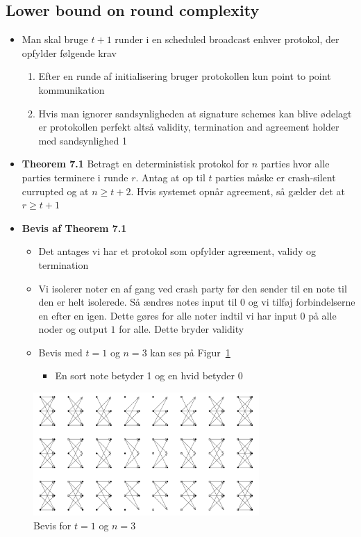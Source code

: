 \documentclass[a4, english]{article}
\begin{document}
\subsection{Lower bound on round complexity}
\begin{itemize}
	\item Man skal bruge $t+1$ runder i en scheduled broadcast enhver protokol, der opfylder følgende krav
  \begin{enumerate}
  	\item Efter en runde af initialisering bruger protokollen kun point to point kommunikation  
    \item Hvis man ignorer sandsynligheden at signature schemes kan blive ødelagt er protokollen perfekt altså validity, termination and agreement holder med sandsynlighed 1
  \end{enumerate}
  \item \textbf{Theorem 7.1} Betragt en deterministisk protokol for $n$ parties hvor alle parties terminere i runde $r$. Antag at op til $t$ parties måske er crash-silent currupted og at $n\geq t+2$. Hvis systemet opnår agreement, så gælder det at $r \geq t+1$  
  \item \textbf{Bevis af Theorem 7.1}
  \begin{itemize}
  	\item Det antages vi har et protokol som opfylder agreement, validy og termination
    \item Vi isolerer noter en af gang ved crash party før den sender til en note til den er helt isolerede. Så ændres notes input til 0 og vi tilføj forbindelserne en efter en igen. Dette gøres for alle noter indtil vi har input $0$ på alle noder og output $1$ for alle. Dette bryder validity
    \item Bevis med $t=1$ og $n=3$ kan ses på Figur~\ref{lower_bound_round_proof} 
    \begin{itemize}
    	\item En sort note betyder 1 og en hvid betyder 0
    \end{itemize}
  \end{itemize}
\end{itemize}
\begin{figure}[H]
	\centering
	\includegraphics[width=325px]{img/lower_bound_round_proof}
	\caption{Bevis for $t=1$ og $n=3$ \label{lower_bound_round_proof}}
\end{figure}
\newpage
\end{document}
